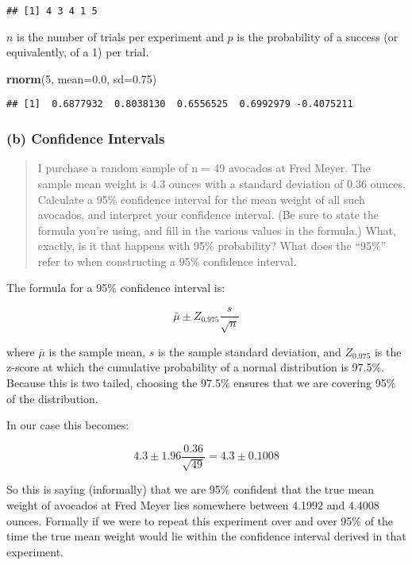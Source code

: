 \documentclass[
]{article}
\newenvironment{Shaded}{\begin{snugshade}}{\end{snugshade}}
\newcommand{\DataTypeTok}[1]{\textcolor[rgb]{0.13,0.29,0.53}{#1}}
\newcommand{\DecValTok}[1]{\textcolor[rgb]{0.00,0.00,0.81}{#1}}
\newcommand{\FloatTok}[1]{\textcolor[rgb]{0.00,0.00,0.81}{#1}}
\newcommand{\KeywordTok}[1]{\textcolor[rgb]{0.13,0.29,0.53}{\textbf{#1}}}
\newcommand{\NormalTok}[1]{#1}
\begin{document}
\begin{verbatim}
## [1] 4 3 4 1 5
\end{verbatim}

\(n\) is the number of trials per experiment and \(p\) is the
probability of a success (or equivalently, of a 1) per trial.

\begin{Shaded}
\begin{Highlighting}[]
\KeywordTok{rnorm}\NormalTok{(}\DecValTok{5}\NormalTok{, }\DataTypeTok{mean=}\FloatTok{0.0}\NormalTok{, }\DataTypeTok{sd=}\FloatTok{0.75}\NormalTok{)}
\end{Highlighting}
\end{Shaded}

\begin{verbatim}
## [1]  0.6877932  0.8038130  0.6556525  0.6992979 -0.4075211
\end{verbatim}

\hypertarget{b-confidence-intervals}{%
\subsubsection{(b) Confidence Intervals}\label{b-confidence-intervals}}

\begin{quote}
I purchase a random sample of n = 49 avocados at Fred Meyer. The sample
mean weight is 4.3 ounces with a standard deviation of 0.36 ounces.
Calculate a 95\% confidence interval for the mean weight of all such
avocados, and interpret your confidence interval. (Be sure to state the
formula you're using, and fill in the various values in the formula.)
What, exactly, is it that happens with 95\% probability? What does the
``95\%'' refer to when constructing a 95\% confidence interval.
\end{quote}

The formula for a 95\% confidence interval is:

\[\bar{\mu} \pm Z_{0.975}\frac{s}{\sqrt{n}}\]

where \(\bar{\mu}\) is the sample mean, \(s\) is the sample standard
deviation, and \(Z_{0.975}\) is the z-score at which the cumulative
probability of a normal distribution is 97.5\%. Because this is two
tailed, choosing the 97.5\% ensures that we are covering 95\% of the
distribution.

In our case this becomes:

\[4.3\pm 1.96 \frac{0.36}{\sqrt{49}}=4.3\pm 0.1008\]

So this is saying (informally) that we are 95\% confident that the true
mean weight of avocados at Fred Meyer lies somewhere between 4.1992 and
4.4008 ounces. Formally if we were to repeat this experiment over and
over 95\% of the time the true mean weight would lie within the
confidence interval derived in that experiment.
\end{document}
